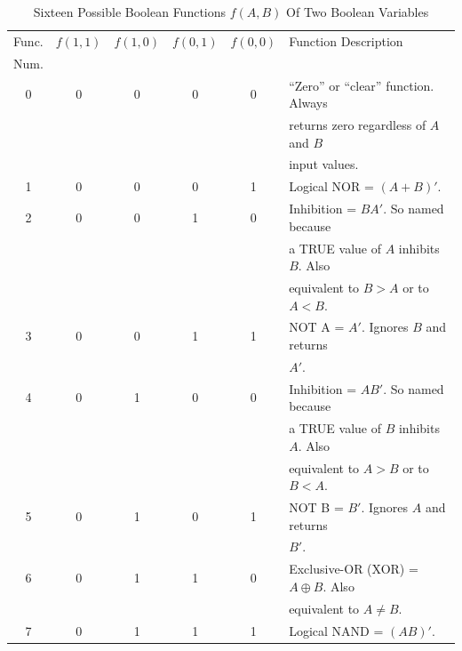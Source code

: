 \begin{table}
\caption{Sixteen Possible Boolean Functions $f(A,B)$ Of Two Boolean Variables}
\label{tbl:cbal0:ssam0:snom0:02}
\begin{center}
\begin{tabular}{|c||c|c|c|c||l|}
\hline
\small{Func.} & $\scriptstyle{f(1,1)}$ & $\scriptstyle{f(1,0)}$ 
              & $\scriptstyle{f(0,1)}$ & $\scriptstyle{f(0,0)}$ 
			  & Function Description \\
\small{Num.}  &          &          &          &          &                 \\
\hline
\hline
 0 & 0 & 0 & 0 & 0 & \small{``Zero'' or  ``clear'' function.  Always}       \\
   &   &   &   &   & \small{returns zero regardless of $A$ and $B$  }       \\
   &   &   &   &   & \small{input values.                           }       \\
\hline
 1 & 0 & 0 & 0 & 1 & \small{Logical NOR = $(A+B)'$.                 }       \\
\hline
 2 & 0 & 0 & 1 & 0 & \small{Inhibition = $BA'$.  So named because   }       \\
   &   &   &   &   & \small{a TRUE value of $A$ inhibits $B$.  Also }       \\
   &   &   &   &   & \small{equivalent to $B>A$ or to $A<B$.        }       \\
\hline
 3 & 0 & 0 & 1 & 1 & \small{NOT A = $A'$.  Ignores $B$ and returns  }       \\
   &   &   &   &   & \small{$A'$.                                   }       \\
\hline
 4 & 0 & 1 & 0 & 0 & \small{Inhibition = $AB'$.  So named because   }       \\
   &   &   &   &   & \small{a TRUE value of $B$ inhibits $A$.  Also }       \\
   &   &   &   &   & \small{equivalent to $A>B$ or to $B<A$.        }       \\
\hline
 5 & 0 & 1 & 0 & 1 & \small{NOT B = $B'$.  Ignores $A$ and returns  }       \\
   &   &   &   &   & \small{$B'$.                                   }       \\
\hline
 6 & 0 & 1 & 1 & 0 & \small{Exclusive-OR (XOR) = $A \oplus B$.  Also}       \\
   &   &   &   &   & \small{equivalent to $A \neq B$.               }       \\
\hline
 7 & 0 & 1 & 1 & 1 & \small{Logical NAND = $(AB)'$.                 }       \\

\end{tabular}
\end{center}
\end{table}
